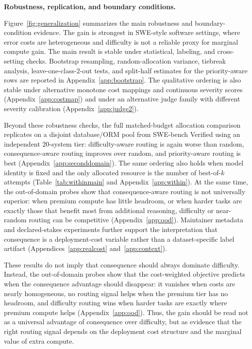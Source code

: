 \documentclass{article}
\begin{document}
\textbf{Robustness, replication, and boundary conditions.}

Figure~\ref{fig:generalization} summarizes the main robustness and
boundary-condition evidence. The gain is strongest in SWE-style
software settings, where error costs are heterogeneous and difficulty
is not a reliable proxy for marginal compute gain. The main result is
stable under statistical, labeling, and cross-setting checks. Bootstrap
resampling, random-allocation variance, tiebreak analysis,
leave-one-class-2-out tests, and split-half estimates for the
priority-aware rows are reported in Appendix~\ref{app:bootstrap}. The
qualitative ordering is also stable under alternative monotone cost
mappings and continuous severity scores (Appendix~\ref{app:costmap}) and
under an alternative judge family with different severity calibration
(Appendix~\ref{app:judge2}).

Beyond these robustness checks, the full matched-budget allocation
comparison replicates on a disjoint database/ORM pool from SWE-bench
Verified using an independent 20-system tier: difficulty-aware routing
is again worse than random, consequence-aware routing improves over
random, and priority-aware routing is best
(Appendix~\ref{app:seconddomain}). The same ordering also holds when
model identity is fixed and the only allocated resource is the number of
best-of-$k$ attempts (Table~\ref{tab:withinmain} and
Appendix~\ref{app:within}). At the same time, the out-of-domain probes
show that consequence-aware routing is not universally superior: when
premium compute has little headroom, or when harder tasks are exactly
those that benefit most from additional reasoning, difficulty or
near-random routing can be competitive (Appendix~\ref{app:ood}).
Maintainer metadata and declared-stakes experiments further support the
interpretation that consequence is a deployment-cost variable rather
than a dataset-specific label artifact (Appendices~\ref{app:realcost}
and~\ref{app:context}).

These results do not imply that consequence should always dominate difficulty. Instead, the out-of-domain probes show that the cost-weighted objective predicts when the consequence advantage should disappear: it vanishes when costs are nearly homogeneous, no routing signal helps when the premium tier has no headroom, and difficulty routing wins when harder tasks are exactly where premium compute helps (Appendix~\ref{app:ood}). Thus, the gain should be read not as a universal advantage of consequence over difficulty, but as evidence that the right routing signal depends on the deployment cost structure and the marginal value of extra compute.
\end{document}
